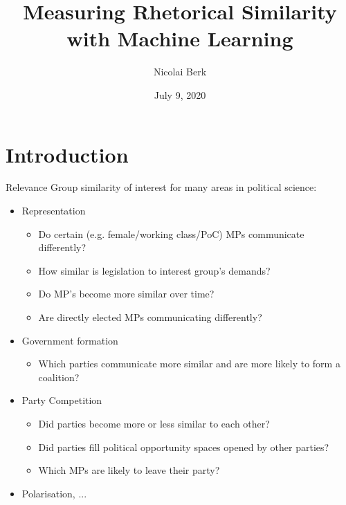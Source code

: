 \documentclass{beamer}
\title{Measuring Rhetorical Similarity with Machine Learning}
\author{Nicolai Berk}
\institute{University of Amsterdam}
\date{July 9, 2020}
\begin{document}
\maketitle

\section{Introduction}

\begin{frame}{Relevance}
    Group similarity of interest for many areas in political science:
    \begin{itemize}
        \item Representation
        \begin{itemize}
            \item Do certain (e.g. female/working class/PoC) MPs communicate differently?
            \item How similar is legislation to interest group's demands?
            \item Do MP's become more similar over time?
            \item Are directly elected MPs communicating differently?
        \end{itemize}
        \item Government formation
        \begin{itemize}
            \item Which parties communicate more similar and are more likely to form a coalition?
        \end{itemize}
        \item Party Competition
        \begin{itemize}
            \item Did parties become more or less similar to each other?
            \item Did parties fill political opportunity spaces opened by other parties?
            \item Which MPs are likely to leave their party?
        \end{itemize}
        \item Polarisation, ...
    \end{itemize}
\end{frame}
\end{document}
